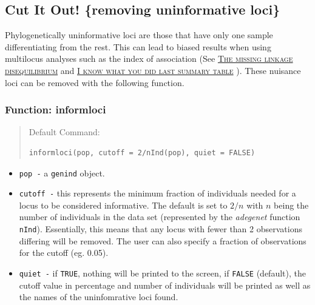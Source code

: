 \documentclass[letterpaper]{article}\usepackage[]{graphicx}\usepackage[]{color}
\makeatletter
\newenvironment{kframe}{%
 \def\at@end@of@kframe{}%
 \ifinner\ifhmode%
  \def\at@end@of@kframe{\end{minipage}}%
  \begin{minipage}{\columnwidth}%
 \fi\fi%
 \def\FrameCommand##1{\hskip\@totalleftmargin \hskip-\fboxsep
 \colorbox{shadecolor}{##1}\hskip-\fboxsep
     \hskip-\linewidth \hskip-\@totalleftmargin \hskip\columnwidth}%
 \MakeFramed {\advance\hsize-\width
   \@totalleftmargin\z@ \linewidth\hsize
   \@setminipage}}%
 {\par\unskip\endMakeFramed%
 \at@end@of@kframe}
\newenvironment{knitrout}{}{} %
\newcommand{\tab}{\hspace*{1em}}
\newcommand{\seclink}[2]{
  \textsc{\hyperref[#1]{#2}}
}
\newcommand{\adegenet}{\textit{adegenet}}
\makeatother
\begin{document}
%
\subsection{Cut It Out!  \{removing uninformative loci\}}
\label{data.manip:informloci}
 \tab\tab Phylogenetically uninformative loci are those that have only one sample differentiating from the rest. This can lead to biased results when using multilocus analyses such as the index of association (See\seclink{index:iard}{The missing linkage disequilibrium}and\seclink{summary}{I know what you did last summary table}). These nuisance loci can be removed with the following function.
\subsubsection{Function: informloci}
\label{data.manip:informloci:informloci}
\begin{quote}
Default Command:
\begin{knitrout}
\color{fgcolor}\begin{kframe}
\begin{verbatim}
informloci(pop, cutoff = 2/nInd(pop), quiet = FALSE)
\end{verbatim}
\end{kframe}
\end{knitrout}

\end{quote}
  \begin{itemize}
    \item \texttt{pop -} a \texttt{genind} object.
    \item \texttt{cutoff -} this represents the minimum fraction of individuals needed for a locus to be considered informative. The default is set to $2/n$ with $n$ being the number of individuals in the data set (represented by the \adegenet{} function \texttt{nInd}). Essentially, this means that any locus with fewer than 2 observations differing will be removed. The user can also specify a fraction of observations for the cutoff (eg. 0.05).
    \item \texttt{quiet -} if \texttt{TRUE}, nothing will be printed to the screen, if \texttt{FALSE} (default), the cutoff value in percentage and number of individuals will be printed as well as the names of the uninfomrative loci found. 
  \end{itemize}
\end{document}
